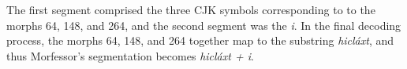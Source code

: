 The first segment comprised the three  
CJK symbols corresponding to to the morphs 64, 148, and 264, 
and the second segment was the \emph{i}. In the final decoding process, 
the morphs 64, 148, and 264 together map to the substring \textit{hicl\'{a}xt}, 
and thus Morfessor's segmentation becomes \textit{hicl\'{a}xt + i}.

%

